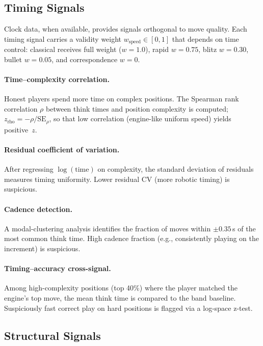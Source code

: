\documentclass[11pt,a4paper]{article}
\theoremstyle{definition}
\begin{document}
\subsection{Timing Signals}
\label{sec:timing}

Clock data, when available, provides signals orthogonal to move quality.
Each timing signal carries a validity weight
$w_{\mathrm{speed}} \in [0, 1]$ that depends on time control:
classical receives full weight ($w = 1.0$), rapid $w = 0.75$, blitz
$w = 0.30$, bullet $w = 0.05$, and correspondence $w = 0$.

\paragraph{Time--complexity correlation.}
Honest players spend more time on complex positions.  The Spearman rank
correlation $\rho$ between think times and position complexity is
computed; $z_{\mathrm{rho}} = -\rho / \mathrm{SE}_\rho$, so that low
correlation (engine-like uniform speed) yields positive~$z$.

\paragraph{Residual coefficient of variation.}
After regressing $\log(\text{time})$ on complexity, the standard
deviation of residuals measures timing uniformity.  Lower residual CV
(more robotic timing) is suspicious.

\paragraph{Cadence detection.}
A modal-clustering analysis identifies the fraction of moves within
$\pm 0.35$\,s of the most common think time.  High cadence fraction
(e.g., consistently playing on the increment) is suspicious.

\paragraph{Timing--accuracy cross-signal.}
Among high-complexity positions (top 40\%) where the player matched the
engine's top move, the mean think time is compared to the band baseline.
Suspiciously fast correct play on hard positions is flagged via a
log-space z-test.

\subsection{Structural Signals}
\label{sec:structural}
\end{document}
